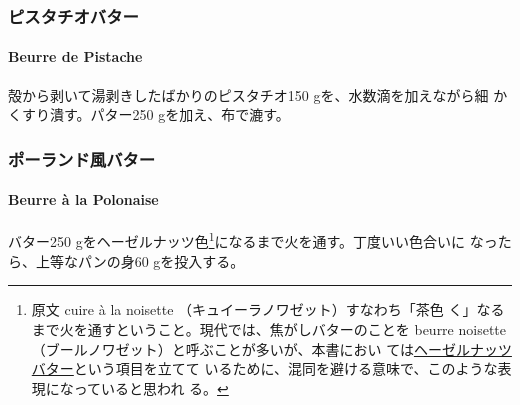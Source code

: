 \begin{recette}
\maeaki

\hypertarget{ux30d4ux30b9ux30bfux30c1ux30aaux30d0ux30bfux30fc}{%
\subsubsection{ピスタチオバター}\label{ux30d4ux30b9ux30bfux30c1ux30aaux30d0ux30bfux30fc}}

\hypertarget{beurre-de-pistache}{%
\paragraph{Beurre de Pistache}\label{beurre-de-pistache}}


殻から剥いて湯剥きしたばかりのピスタチオ150 gを、水数滴を加えながら細
かくすり潰す。パター250 gを加え、布で漉す。

\maeaki

\hypertarget{ux30ddux30fcux30e9ux30f3ux30c9ux98a8ux30d0ux30bfux30fc}{%
\subsubsection{ポーランド風バター}\label{ux30ddux30fcux30e9ux30f3ux30c9ux98a8ux30d0ux30bfux30fc}}

\hypertarget{beurre-a-la-polonaise}{%
\paragraph{Beurre à la Polonaise}\label{beurre-a-la-polonaise}}


バター250 gをヘーゼルナッツ色\footnote{原文 cuire à la noisette
  （キュイーラノワゼット）すなわち「茶色
  く」なるまで火を通すということ。現代では、焦がしバターのことを beurre
  noisette （ブールノワゼット）と呼ぶことが多いが、本書におい
  ては\protect\hyperlink{beurre-de-noisette}{ヘーゼルナッツバター}という項目を立てて
  いるために、混同を避ける意味で、このような表現になっていると思われ
  る。}になるまで火を通す。丁度いい色合いに なったら、上等なパンの身60
gを投入する。


\end{recette}
